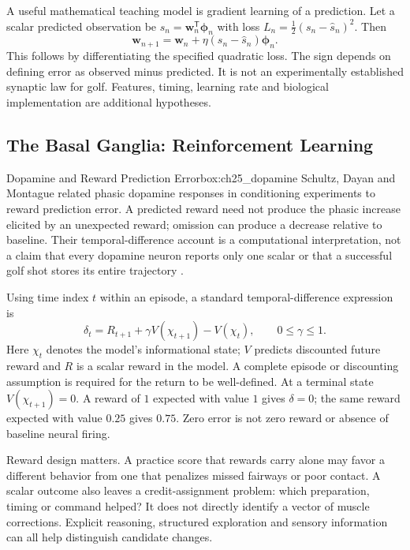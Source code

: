 A useful mathematical teaching model is gradient learning of a prediction. Let a scalar predicted observation be $\hat s_n=\bm{w}_n^{\mathsf T}\bm{\phi}_n$ with loss $L_n=\tfrac12(s_n-\hat s_n)^2$. Then
\begin{equation}
\bm{w}_{n+1}=\bm{w}_n+\eta(s_n-\hat s_n)\bm{\phi}_n.
\label{eq:ch25_ltd_rule}
\end{equation}
This follows by differentiating the specified quadratic loss. The sign depends on defining error as observed minus predicted. It is not an experimentally established synaptic law for golf. Features, timing, learning rate and biological implementation are additional hypotheses.

\subsection{The Basal Ganglia: Reinforcement Learning}
\label{subsec:ch25_basal_ganglia_learning}

\begin{principle}{Dopamine and Reward Prediction Error}{box:ch25_dopamine}
Schultz, Dayan and Montague related phasic dopamine responses in conditioning experiments to reward prediction error. A predicted reward need not produce the phasic increase elicited by an unexpected reward; omission can produce a decrease relative to baseline. Their temporal-difference account is a computational interpretation, not a claim that every dopamine neuron reports only one scalar or that a successful golf shot stores its entire trajectory \citep{schultz1997dopamine}.
\end{principle}

Using time index $t$ within an episode, a standard temporal-difference expression is
\[
\delta_t=R_{t+1}+\gamma V(\chi_{t+1})-V(\chi_t),\qquad 0\leq\gamma\leq1.
\]
Here $\chi_t$ denotes the model's informational state; $V$ predicts discounted future reward and $R$ is a scalar reward in the model. A complete episode or discounting assumption is required for the return to be well-defined. At a terminal state $V(\chi_{t+1})=0$. A reward of $1$ expected with value $1$ gives $\delta=0$; the same reward expected with value $0.25$ gives $0.75$. Zero error is not zero reward or absence of baseline neural firing.

Reward design matters. A practice score that rewards carry alone may favor a different behavior from one that penalizes missed fairways or poor contact. A scalar outcome also leaves a credit-assignment problem: which preparation, timing or command helped? It does not directly identify a vector of muscle corrections. Explicit reasoning, structured exploration and sensory information can all help distinguish candidate changes.

